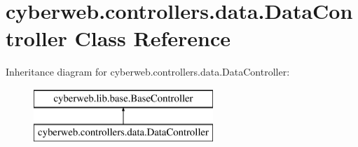\hypertarget{classcyberweb_1_1controllers_1_1data_1_1_data_controller}{\section{cyberweb.\-controllers.\-data.\-Data\-Controller \-Class \-Reference}
\label{classcyberweb_1_1controllers_1_1data_1_1_data_controller}
}
\-Inheritance diagram for cyberweb.\-controllers.\-data.\-Data\-Controller\-:\begin{figure}[H]
\begin{center}
\leavevmode
\includegraphics[height=2.000000cm]{classcyberweb_1_1controllers_1_1data_1_1_data_controller}
\end{center}
\end{figure}
